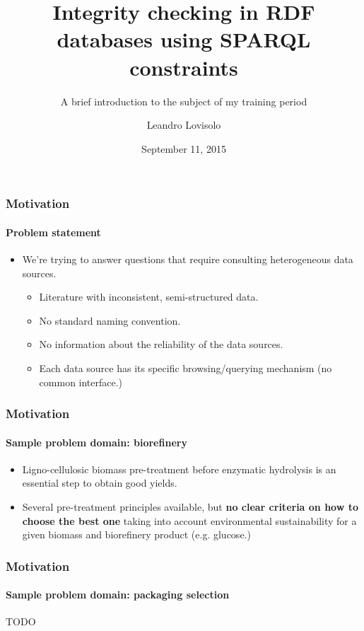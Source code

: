 \documentclass{beamer}
\title{Integrity checking in RDF databases using SPARQL constraints}
\subtitle{
  A brief introduction to the subject of my training period
}
\author{
  Leandro Lovisolo
}
\date{September 11, 2015}
\institute{
  I.N.R.A. SupAgro \\
  Montpellier, France
}
\begin{document}
\begin{frame}
  \titlepage
\end{frame}

\begin{frame}
  \frametitle{Motivation}
  \framesubtitle{Problem statement}

  \pause

  \begin{itemize}
    \item We're trying to answer questions that require consulting
      heterogeneous data sources.

    \pause

    \begin{itemize}
      \item Literature with inconsistent, semi-structured data.

      \pause

      \item No standard naming convention.

      \pause

      \item No information about the reliability of the data sources.

      \pause

      \item Each data source has its specific browsing/querying mechanism (no
        common interface.)
    \end{itemize}
  \end{itemize}
\end{frame}

\begin{frame}
  \frametitle{Motivation}
  \framesubtitle{Sample problem domain: \textbf{biorefinery}}

  \begin{itemize}
    \item Ligno-cellulosic biomass pre-treatment before enzymatic hydrolysis is
      an essential step to obtain good yields.

    \pause

    \item Several pre-treatment principles available, but \textbf{no clear
      criteria on how to choose the best one} taking into account environmental
      sustainability for a given biomass and biorefinery product (e.g.
      glucose.)
  \end{itemize}
\end{frame}

\begin{frame}
  \frametitle{Motivation}
  \framesubtitle{Sample problem domain: \textbf{packaging selection}}

  TODO
\end{frame}
\end{document}
